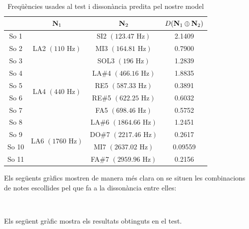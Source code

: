 \documentclass{article}
\theoremstyle{math}
\theoremstyle{TheoremNum}
\newcommand{\0}{\ensuremath{\vb{0}}}
\newcommand{\N}{\ensuremath{\vb{N}}}
\newcommand\Hz{\text{ Hz}}
\begin{document}
\begin{table}[ht]
    \centering
    \begin{tabular}{| c | c | c | c |}
    \cline{2-4}
    \multicolumn{1}{c|}{} & $\N_1$ & $\N_2$ & $D(\N_1\oplus\N_2)$\\
    \hline
    \hline
    So 1 & \multirow{3}{2.5cm}{LA2 $(110\Hz)$} & SI2 $(123.47\Hz)$ & 2.1409\\
    \cline{1-1}\cline{3-4}
    So 2 & & MI3 $(164.81\Hz)$ & 0.7900\\		
    \cline{1-1}\cline{3-4}
    So 3 & & SOL3 $(196\Hz)$  & 1.2839\\
    \hline
    So 4 & \multirow{4}{2.5cm}{LA4 $(440\Hz)$} & LA\#4 $(466.16\Hz)$ & 1.8835 \\
    \cline{1-1}\cline{3-4}
    So 5 & & RE5 $(587.33\Hz)$  & 0.3891 \\
    \cline{1-1}\cline{3-4}
    So 6 & & RE\#5 $(622.25\Hz)$ & 0.6032 \\
    \cline{1-1}\cline{3-4}
    So 7 & & FA5 $(698.46\Hz)$ & 0.5752 \\
    \hline
    So 8 & \multirow{4}{2.5cm}{LA6 $(1760\Hz)$} & LA\#6 $(1864.66\Hz)$ & 1.2451 \\
    \cline{1-1}\cline{3-4}
    So 9 & & DO\#7 $(2217.46\Hz)$ & 0.2617 \\
    \cline{1-1}\cline{3-4}
    So 10 & & MI7 $(2637.02\Hz)$ & 0.09559 \\
    \cline{1-1}\cline{3-4}
    So 11 & & FA\#7 $(2959.96\Hz)$ & 0.2156 \\
    \hline
    \end{tabular}
    \caption{Freqüències usades al test i dissonància predita pel nostre model}
    \label{tab:3}
\end{table}\par
Els següents gràfics mostren de manera més clara on se situen les combinacions de notes escollides pel que fa a la dissonància entre elles:
\begin{center}
    
    \\
    
\end{center}
Els següent gràfic mostra els resultats obtinguts en el test.\par
\end{document}
